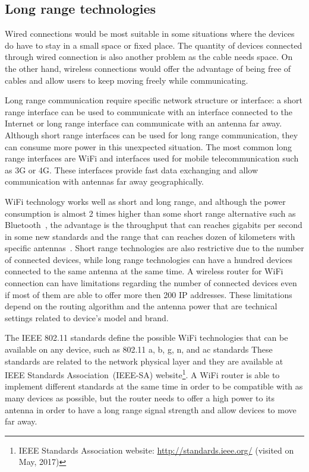 \subsection*{Long range technologies} 

Wired connections would be most suitable in some situations where the devices do have to stay in a small space or fixed place.
The quantity of devices connected through wired connection is also another problem as the cable needs space.
On the other hand, wireless connections would offer the advantage of being free of cables and allow users to keep moving freely while communicating.

Long range communication require specific network structure or interface: a short range interface can be used to communicate with an interface connected to the Internet or long range interface can communicate with an antenna far away.
Although short range interfaces can be used for long range communication, they can consume more power in this unexpected situation.
The most common long range interfaces are WiFi and interfaces used for mobile telecommunication such as 3G or 4G.
These interfaces provide fast data exchanging and allow communication with antennas far away geographically. 

WiFi technology works well as short and long range, and although the power consumption is almost 2 times higher than some short range alternative such as Bluetooth~\citep{Friedman2013wifibluetooth}, the advantage is the throughput that can reaches gigabits per second in some new standards and the range that can reaches dozen of kilometers with specific antennas~\citep{Raman2007Experienceswifiindia}.
Short range technologies are also restrictive due to the number of connected devices, while long range technologies can have a hundred devices connected to the same antenna at the same time.
A wireless router for WiFi connection can have limitations regarding the number of connected devices even if most of them are able to offer more then 200 IP addresses.
These limitations depend on the routing algorithm and the antenna power that are technical settings related to device's model and brand.

The IEEE 802.11 standards define the possible WiFi technologies that can be available on any device, such as 802.11 a, b, g, n, and ac standards
These standards are related to the network physical layer and they are available at IEEE Standards Association~(IEEE-SA) website\footnote{IEEE Standards Association website: \url{http://standards.ieee.org/} (visited on May, 2017)}.
A WiFi router is able to implement different standards at the same time in order to be compatible with as many devices as possible, but the router needs to offer a high power to its antenna in order to have a long range signal strength and allow devices to move far away.


